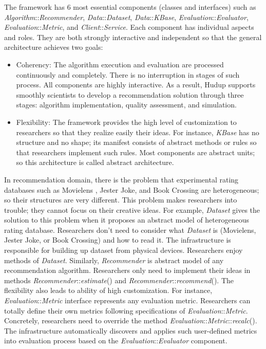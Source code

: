 \documentclass[a4paper]{llncs}
\begin{document}
The framework has 6 most essential components (classes and interfaces) such as \textit{Algorithm}::\textit{Recommender}, \textit{Data}::\textit{Dataset}, \textit{Data}::\textit{KBase}, \textit{Evaluation}::\textit{Evaluator}, \textit{Evaluation}::\textit{Metric}, and \textit{Client}::\textit{Service}. Each component has individual aspects and roles. They are both strongly interactive and independent so that the general architecture achieves two goals:
\begin{itemize}
\item Coherency: The algorithm execution and evaluation are processed continuously and completely. There is no interruption in stages of such process. All components are highly interactive. As a result, Hudup supports smoothly scientists to develop a recommendation solution through three stages: algorithm implementation, quality assessment, and simulation.
\item Flexibility: The framework provides the high level of customization to researchers so that they realize easily their ideas. For instance, \textit{KBase} has no structure and no shape; its manifest consists of abstract methods or rules so that researchers implement such rules. Most components are abstract units; so this architecture is called abstract architecture.
\end{itemize}
In recommendation domain, there is the problem that experimental rating databases such as Movielens \cite{movielens}, Jester Joke, and Book Crossing are heterogeneous; so their structures are very different. This problem makes researchers into trouble; they cannot focus on their creative ideas. For example, \textit{Dataset} gives the solution to this problem when it proposes an abstract model of heterogeneous rating database. Researchers don't need to consider what \textit{Dataset} is (Movielens, Jester Joke, or Book Crossing) and how to read it. The infrastructure is responsible for building up dataset from physical devices. Researchers enjoy methods of \textit{Dataset}. Similarly, \textit{Recommender} is abstract model of any recommendation algorithm. Researchers only need to implement their ideas in methods \textit{Recommender}::\textit{estimate}() and \textit{Recommender}::\textit{recommend}(). The flexibility also leads to ability of high customization. For instance, \textit{Evaluation}::\textit{Metric} interface represents any evaluation metric. Researchers can totally define their own metrics following specifications of \textit{Evaluation}::\textit{Metric}. Concretely, researchers need to override the method \textit{Evaluation}::\textit{Metric}::\textit{recalc}(). The infrastructure automatically discovers and applies such user-defined metrics into evaluation process based on the \textit{Evaluation}::\textit{Evaluator} component.
\end{document}
